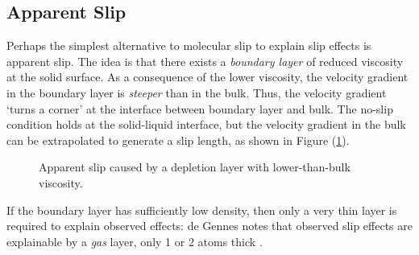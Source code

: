 \documentclass[12pt, a4paper, twoside, openright]{book}
\begin{document}
\subsection{Apparent Slip}

Perhaps the simplest alternative to molecular slip to explain slip effects is apparent slip. The idea is that there exists a \emph{boundary layer} of reduced viscosity at the solid surface. As a consequence of the lower viscosity, the velocity gradient in the boundary layer is \emph{steeper} than in the bulk. Thus, the velocity gradient `turns a corner' at the interface between boundary layer and bulk. The no-slip condition holds at the solid-liquid interface, but the velocity gradient in the bulk can be extrapolated to generate a slip length, as shown in Figure (\ref{depletion}).

\begin{figure}[ht]
\centering
{}
\caption{Apparent slip caused by a depletion layer with lower-than-bulk viscosity.} \label{depletion}
\end{figure}



If the boundary layer has sufficiently low density, then only a very thin layer is required to explain observed effects:  de Gennes notes that observed slip effects are explainable by a \emph{gas} layer, only 1 or 2 atoms thick \cite{deGennes2002}.
\end{document}
